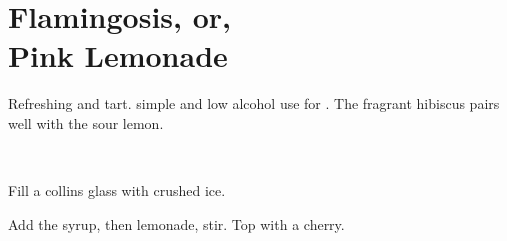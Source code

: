 \section[Flamingosis]{Flamingosis, or,\\Pink Lemonade~}%


\begin{recipestats}[
    servings=1,
    preptime=5~\minute,
    original=Mike \& Jane,
]
\end{recipestats}


\begin{recipeabstract}
    Refreshing and tart.
    simple and low alcohol use for .
    The fragrant hibiscus pairs well with the sour lemon.
\end{recipeabstract}


\begin{ingredientcolumns}[1]
	\begin{ingredientblock}
		\\
	\end{ingredientblock}
\end{ingredientcolumns}

\begin{preparation}
\item Fill a collins glass with crushed ice.
\item Add the syrup, then lemonade, stir. Top with a cherry.
\end{preparation}


\recipeend%
